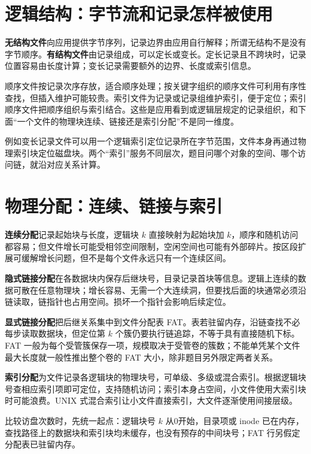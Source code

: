 \section{逻辑结构：字节流和记录怎样被使用}\label{os-6-4}

\textbf{无结构文件}向应用提供字节序列，记录边界由应用自行解释；所谓无结构不是没有字节顺序。\textbf{有结构文件}由记录组成，可以定长或变长。定长记录且不跨块时，记录位置容易由长度计算；变长记录需要额外的边界、长度或索引信息。

顺序文件按记录次序存放，适合顺序处理；按关键字组织的顺序文件可利用有序性查找，但插入维护可能较贵。索引文件为记录或记录组维护索引，便于定位；索引顺序文件把顺序组织与索引结合。这些是应用看到或逻辑层规定的记录组织，和下面``一个文件的物理块连续、链接还是索引分配''不是同一维度。

例如变长记录文件可以用一个逻辑索引定位记录所在字节范围，文件本身再通过物理索引块定位磁盘块。两个``索引''服务不同层次，题目问哪个对象的空间、哪个访问链，就沿对应关系计算。

\section{物理分配：连续、链接与索引}\label{os-6-5}

\textbf{连续分配}记录起始块与长度，逻辑块 \(k\) 直接映射为起始块加 \(k\)，顺序和随机访问都容易；但文件增长可能受相邻空间限制，空闲空间也可能有外部碎片。按区段扩展可缓解增长问题，但不是每个文件永远只有一个连续区间。

\textbf{隐式链接分配}在各数据块内保存后继块号，目录记录首块等信息。逻辑上连续的数据可散在任意物理块；增长容易、无需一个大连续洞，但要找后面的块通常必须沿链读取，链指针也占用空间。损坏一个指针会影响后续定位。

\textbf{显式链接分配}把后继关系集中到文件分配表 FAT。表若驻留内存，沿链查找不必每步读取数据块，但定位第 \(k\) 个簇仍要执行链追踪，不等于具有直接随机下标。FAT 一般为每个受管簇保存一项，规模取决于受管卷的簇数；不能单凭某个文件最大长度就一般性推出整个卷的 FAT 大小，除非题目另外限定两者关系。

\textbf{索引分配}为文件记录各逻辑块的物理块号，可单级、多级或混合索引。根据逻辑块号查相应索引项即可定位，支持随机访问；索引本身占空间，小文件使用大索引块时可能浪费。UNIX 式混合索引让小文件直接索引，大文件逐渐使用间接层级。

比较访盘次数时，先统一起点：逻辑块号 \(k\) 从0开始，目录项或 inode 已在内存，查找路径上的数据块和索引块均未缓存，也没有预存的中间块号；FAT 行另假定分配表已驻留内存。

